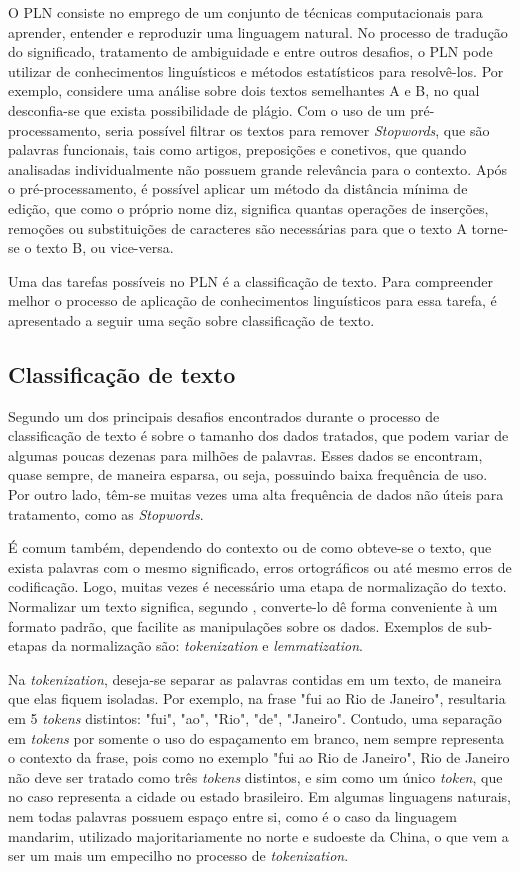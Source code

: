O PLN consiste no emprego de um conjunto de técnicas computacionais para aprender, entender e reproduzir uma linguagem natural. No processo de tradução do significado, tratamento de ambiguidade e entre outros desafios, o PLN pode utilizar de conhecimentos linguísticos e métodos estatísticos para resolvê-los. Por exemplo, considere uma análise sobre dois textos semelhantes A e B, no qual desconfia-se que exista possibilidade de plágio. Com o uso de um pré-processamento, seria possível filtrar os textos para remover \textit{Stopwords}, que são palavras funcionais, tais como artigos, preposições e conetivos, que quando analisadas individualmente não possuem grande relevância para o contexto. Após o pré-processamento, é possível aplicar um método da distância mínima de edição, que como o próprio nome diz, significa quantas operações de inserções, remoções ou substituições de caracteres são necessárias para que o texto A torne-se o texto B, ou vice-versa. 

Uma das tarefas possíveis no PLN é a classificação de texto. Para compreender melhor o processo de aplicação de conhecimentos linguísticos para essa tarefa, é apresentado a seguir uma seção sobre classificação de texto.

\subsection{Classificação de texto}
Segundo \cite{aggarwal2014data} um dos principais desafios encontrados durante o processo de classificação de texto é sobre o tamanho dos dados tratados, que podem variar de algumas poucas dezenas para milhões de palavras. Esses dados se encontram, quase sempre, de maneira esparsa, ou seja, possuindo baixa frequência de uso. Por outro lado, têm-se muitas vezes uma alta frequência de dados não úteis para tratamento, como as \textit{Stopwords}.

É comum também, dependendo do contexto ou de como obteve-se o texto, que exista palavras com o mesmo significado, erros ortográficos ou até mesmo erros de codificação. Logo, muitas vezes é necessário uma etapa de normalização do texto. Normalizar um texto significa, segundo \citep{martin2018speech}, converte-lo dê forma conveniente à um formato padrão, que facilite as manipulações sobre os dados. Exemplos de sub-etapas da normalização são: \textit{tokenization} e \textit{lemmatization}. 

Na \textit{tokenization}, deseja-se separar as palavras contidas em um texto, de maneira que elas fiquem isoladas. Por exemplo, na frase "fui ao Rio de Janeiro", resultaria em 5 \textit{tokens} distintos: "fui", "ao", "Rio", "de", "Janeiro". Contudo, uma separação em \textit{tokens} por somente o uso do espaçamento em branco, nem sempre representa o contexto da frase, pois como no exemplo "fui ao Rio de Janeiro", Rio de Janeiro não deve ser tratado como três \textit{tokens} distintos, e sim como um único \textit{token}, que no caso representa a cidade ou estado brasileiro. Em algumas linguagens naturais, nem todas palavras possuem espaço entre si, como é o caso da linguagem mandarim, utilizado majoritariamente no norte e sudoeste da China, o que vem a ser um mais um empecilho no processo de \textit{tokenization}. 

